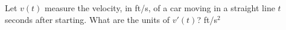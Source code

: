 {Let $v(t)$ measure the velocity, in ft/s, of a car moving in a straight line $t$ seconds after starting. What are the units of $v'(t)$?
}
{ft/s$^2$
}
